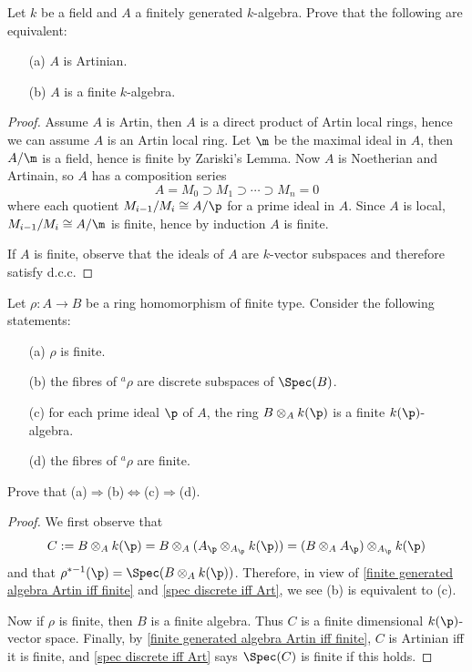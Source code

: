 \begin{exercise}\label{finite generated algebra Artin iff finite}
Let $k$ be a field and $A$ a finitely generated $k$-algebra. Prove that the following are equivalent:
\begin{itemize}
\item[(a)] $A$ is Artinian.
\item[(b)] $A$ is a finite $k$-algebra.
\end{itemize}
\end{exercise}
\begin{proof}
Assume $A$ is Artin, then $A$ is a direct product of Artin local rings, hence we can assume $A$ is an Artin local ring. Let $\m$ be the maximal ideal in $A$, then $A/\m$ is a field, hence is finite by Zariski's Lemma. Now $A$ is Noetherian and Artinain, so $A$ has a composition series
\[A=M_0\supset M_1\supset\cdots\supset M_n=0\]
where each quotient $M_{i-1}/M_i\cong A/\p$ for a prime ideal in $A$. Since $A$ is local, $M_{i-1}/M_i\cong A/\m$ is finite, hence by induction $A$ is finite.\par
If $A$ is finite, observe that the ideals of $A$ are $k$-vector subspaces and therefore satisfy d.c.c.
\end{proof}
\begin{exercise}
Let $\rho:A\to B$ be a ring homomorphism of finite type. Consider the following
statements:
\begin{itemize}
\item[(a)] $\rho$ is finite.
\item[(b)] the fibres of $^{a}\!\rho$ are discrete subspaces of $\Spec(B)$.
\item[(c)] for each prime ideal $\p$ of $A$, the ring $B\otimes_Ak(\p)$ is a finite $k(\p)$-algebra.
\item[(d)] the fibres of $^{a}\!\rho$ are finite.
\end{itemize}
Prove that (a)$\Rightarrow$(b)$\Leftrightarrow$(c)$\Rightarrow$(d).
\end{exercise}
\begin{proof}
We first observe that
\[C:=B\otimes_Ak(\p)=B\otimes_A(A_\p\otimes_{A_\p}k(\p))=(B\otimes_AA_\p)\otimes_{A_\p}k(\p)\]
and that $\rho^{*-1}(\p)=\Spec(B\otimes_Ak(\p))$. Therefore, in view of \cref{finite generated algebra Artin iff finite} and \cref{spec discrete iff Art}, we see (b) is equivalent to (c).\par
Now if $\rho$ is finite, then $B$ is a finite algebra. Thus $C$ is a finite dimensional $k(\p)$-vector space. Finally, by \cref{finite generated algebra Artin iff finite}, $C$ is Artinian iff it is finite, and \cref{spec discrete iff Art} says $\Spec(C)$ is finite if this holds.
\end{proof}
